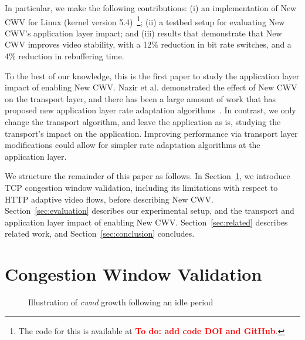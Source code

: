 \documentclass[10pt,sigconf]{acmart}
\newcommand{\todo}[1]{\textbf{\textcolor{red}{To do: #1}}}
\begin{document}
In particular, we make the following contributions: (i) an implementation of New CWV for Linux (kernel version 5.4)~\footnote{The code for this is available at \todo{add code DOI and GitHub}.}; (ii) a testbed setup for evaluating New CWV's application layer impact; and (iii) results that demonstrate that New CWV improves video stability, with a 12\% reduction in bit rate switches, and a 4\% reduction in rebuffering time.


To the best of our knowledge, this is the first paper to study the application
layer impact of enabling New CWV. 
Nazir et al. \cite{Nazir-2014-performance-evaluation-congestion-window-validation-dash-newcwv}
demonstrated the effect of New CWV on the transport layer, and there has been a large amount of work that has proposed new application layer rate adaptation algorithms~\cite{Mok-2012-qdash,Huang-2015-A-buffer-based-approach-to-rate-adaptation-bba, Yin-2015-a-control-theoritic-approach}. In contrast, we only change the transport algorithm, and leave the application as is, studying the transport's impact on the application. Improving performance via transport layer modifications could allow for simpler rate adaptation algorithms at the application layer.


We structure the remainder of this paper as follows. In Section~\ref{sec:background}, we introduce TCP congestion window validation, including its limitations with respect to HTTP adaptive video flows, before describing New CWV. Section~\ref{sec:evaluation} describes our experimental setup, and the transport and application layer impact of enabling New CWV. Section~\ref{sec:related} describes related work, and Section~\ref{sec:conclusion} concludes.

\section{Congestion Window Validation}
\label{sec:background}

\begin{figure}
  \centering
    \caption{Illustration of \emph{cwnd} growth following an idle period}
    \label{fig:cwnd-growth-after-idle}
\end{figure}
\end{document}
